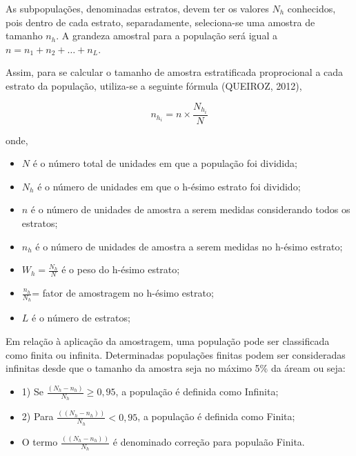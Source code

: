 As subpopulações, denominadas estratos, devem ter os valores
$N_{h}$ conhecidos, pois dentro de cada estrato, separadamente,
seleciona-se uma amostra de tamanho $n_{h}$. A grandeza amostral
para a população será igual a $n=n_{1}+n_{2}+\ldots+n_{L}$.
\vskip0.3cm

Assim, para se calcular o tamanho de amostra estratificada
proprocional a cada estrato da população, utiliza-se a seguinte
fórmula (QUEIROZ, 2012),

\begin{equation}\label{amostestra}
n_{h_{i}}= n \times \frac{N_{h_{i}}}{N}
\end{equation}

onde, 

\begin{itemize}
\item $N$ é o número total de unidades em que a população foi dividida;
\item $N_{h}$ é o número de unidades em que o h-ésimo estrato foi dividido;
\item $n$ é o número de unidades de amostra a serem medidas considerando todos os estratos;
\item $n_{h}$ é o número de unidades de amostra a serem medidas no h-ésimo estrato;
\item $W_{h}={\frac{N_{h}}{N}}$ é o peso do h-ésimo estrato;
\item $\frac{n_{h}}{N_{h}}$= fator de amostragem no h-ésimo estrato; 
\item $L$ é o número de estratos;
\end{itemize}

Em relação à aplicação da amostragem, uma população pode ser classificada como finita ou infinita. Determinadas populações finitas podem ser consideradas infinitas desde que o tamanho da amostra seja no máximo 5\% da áream ou seja:

\begin{itemize}
    \item 1) Se $\frac{(N_{h}-n_{h})}{N_{h}} \geqslant 0,95$, a população é definida como Infinita; 
    \item 2) Para $\frac{((N_{h}-n_{h}))}{N_{h}} < 0,95$, a população é definida como Finita;
    \item O termo $\frac{((N_{h}-n_{h}))}{N_{h}}$ é denominado correção para populaão Finita.
\end{itemize}













